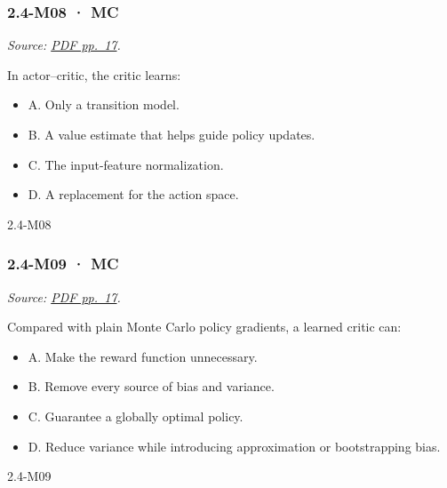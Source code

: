 \noindent\begin{minipage}{\linewidth}

\subsubsection{2.4-M08 · MC}\label{m08-mc-6}

\emph{Source:
\href{../Lecture\%20Slides/2.4.\%20Policy\%20Search.pdf\#page=17}{PDF
pp.~17}.}

In actor--critic, the critic learns:

\begin{itemize}
\tightlist
\item
  A. Only a transition model.
\item
  B. A value estimate that helps guide policy updates.
\item
  C. The input-feature normalization.
\item
  D. A replacement for the action space.
\end{itemize}

\begin{solution}[8mm]{2.4-M08}

\end{solution}
\end{minipage}\par\medskip

\noindent\begin{minipage}{\linewidth}

\subsubsection{2.4-M09 · MC}\label{m09-mc-6}

\emph{Source:
\href{../Lecture\%20Slides/2.4.\%20Policy\%20Search.pdf\#page=17}{PDF
pp.~17}.}

Compared with plain Monte Carlo policy gradients, a learned critic can:

\begin{itemize}
\tightlist
\item
  A. Make the reward function unnecessary.
\item
  B. Remove every source of bias and variance.
\item
  C. Guarantee a globally optimal policy.
\item
  D. Reduce variance while introducing approximation or bootstrapping
  bias.
\end{itemize}

\begin{solution}[8mm]{2.4-M09}

\end{solution}
\end{minipage}\par\medskip

